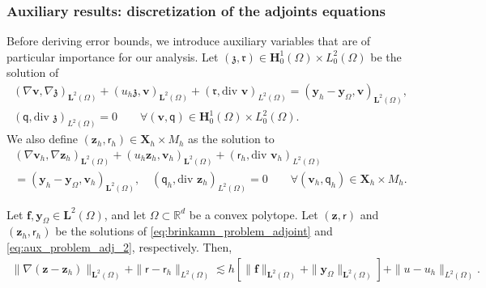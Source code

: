 \documentclass[final]{siamart0216}
\begin{document}
\subsubsection{Auxiliary results: discretization of the adjoints equations}
Before deriving error bounds, we introduce auxiliary variables that are of particular importance for our analysis. Let $(\boldsymbol{\mathfrak{z}},\mathfrak{r})\in \mathbf{H}_0^1(\Omega)\times L_0^2(\Omega)$ be the solution of
\begin{multline}\label{eq:aux_problem_adj_1}
(\nabla \mathbf{v},\nabla \boldsymbol{\mathfrak{z}})_{\mathbf{L}^2(\Omega)}+( u_{h}\boldsymbol{\mathfrak{z}}, \mathbf{v})_{\mathbf{L}^2(\Omega)}+(\mathfrak{r},\text{div }\mathbf{v})_{L^2(\Omega)} =  	(\mathbf{y}_{h}-\mathbf{y}_{\Omega},\mathbf{v})_{\mathbf{L}^2(\Omega)},
\\
(\mathsf{q},\text{div }\boldsymbol{\mathfrak{z}})_{L^2(\Omega)}  =  0 \qquad \forall(\mathbf{v},\mathsf{q})\in \mathbf{H}_0^1(\Omega)\times L_0^2(\Omega).
\end{multline}
We also define $(\mathbf{z}_{h},\mathsf{r}_{h})\in \mathbf{X}_h\times M_h$ as the solution to
\begin{multline}\label{eq:aux_problem_adj_2}
(\nabla \mathbf{v}_{h},\nabla \mathbf{z}_{h})_{\mathbf{L}^2(\Omega)}+( u_{h}\mathbf{z}_{h}, \mathbf{v}_{h})_{\mathbf{L}^2(\Omega)}+(\mathsf{r}_{h},\text{div }\mathbf{v}_{h})_{L^2(\Omega)} \\=  	(\mathbf{y}_{h}-\mathbf{y}_{\Omega},\mathbf{v}_{h})_{\mathbf{L}^2(\Omega)},
\quad
(\mathsf{q}_{h},\text{div }\mathbf{z}_h)_{L^2(\Omega)}  =  0 \qquad \forall (\mathbf{v}_{h},\mathsf{q}_{h})\in \mathbf{X}_h\times M_h.
\end{multline}

\begin{proposition}
\label{eq:theorem_adjoint_aux_estimates}
Let $\mathbf{f},\mathbf{y}_{\Omega}\in \mathbf{L}^2(\Omega)$, and let $\Omega \subset \mathbb{R}^d$ be a convex polytope. Let $(\mathbf{z},\mathsf{r})$ and $(\mathbf{z}_{h},\mathsf{r}_{h})$ be the solutions of \eqref{eq:brinkamn_problem_adjoint} and \eqref{eq:aux_problem_adj_2}, respectively. Then,
\begin{align}\label{eq:errorbound_adj}
\|\nabla(\mathbf{z}-\mathbf{z}_{h})\|_{\mathbf{L}^2(\Omega)}+\|\mathsf{r}-\mathsf{r}_{h}\|_{L^2(\Omega)}\lesssim h [ \|\mathbf{f}\|_{\mathbf{L}^2(\Omega)}+\|\mathbf{y}_{\Omega}\|_{\mathbf{L}^2(\Omega)}] + \|u-u_{h}\|_{L^2(\Omega)}.
\end{align}
\end{proposition}
\end{document}
